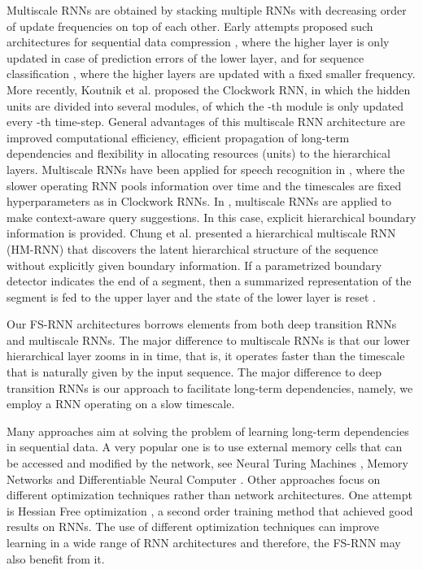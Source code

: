 \documentclass{article}
\begin{document}
Multiscale RNNs are obtained by stacking multiple  RNNs with decreasing order of update frequencies on top of each other. Early attempts proposed such  architectures for sequential data compression \cite{schmidhuber1992learning}, where the higher layer is only updated in case of prediction errors of the lower layer, and for sequence classification \cite{el1995hierarchical}, where the higher layers are updated with a fixed smaller frequency. More recently, Koutnik et al. \cite{koutnik2014clockwork} proposed the Clockwork RNN, in which the hidden units are divided into several modules, of which the -th module is only updated every -th time-step. General advantages of this multiscale RNN architecture are improved computational efficiency, efficient propagation of long-term dependencies and flexibility in allocating resources (units) to the hierarchical layers. 
Multiscale RNNs have been applied for speech recognition in \cite{bahdanau2016timepooling}, where the slower operating RNN pools information over time and the timescales are fixed hyperparameters as in Clockwork RNNs. In \cite{sordoni2015hierarchical}, multiscale RNNs are applied to make context-aware query suggestions. In this case, explicit hierarchical boundary information is provided. Chung et al. \cite{chung2016multiscale}  presented a hierarchical multiscale RNN (HM-RNN) that discovers the latent hierarchical structure of the sequence without explicitly given boundary information. If a parametrized boundary detector indicates the end of a segment, then a summarized representation of the segment is fed to the upper layer and the state of the lower layer is reset \cite{chung2016multiscale}. 


 Our FS-RNN architectures borrows elements from both deep transition RNNs and multiscale RNNs. The major difference to multiscale RNNs is that our lower hierarchical layer zooms in in time, that is, it operates faster than the timescale that is naturally given by the input sequence. The major difference to deep transition RNNs is our approach to facilitate long-term dependencies, namely, we employ a RNN operating on a slow timescale.






 Many approaches aim at solving the problem of learning long-term dependencies in sequential data. A very popular one is to use external memory cells that can be accessed and modified by the network, see  Neural Turing Machines \cite{graves2014neural}, Memory Networks \cite{weston2014memory} and Differentiable Neural Computer \cite{graves2016hybrid}. Other approaches  focus on different optimization techniques rather than network architectures. One attempt is Hessian Free optimization \cite{martens2011learning}, a second order training method that achieved good results on RNNs. The use of different optimization techniques can improve learning in a wide range of RNN architectures and therefore, the FS-RNN may also benefit from it.
\end{document}
